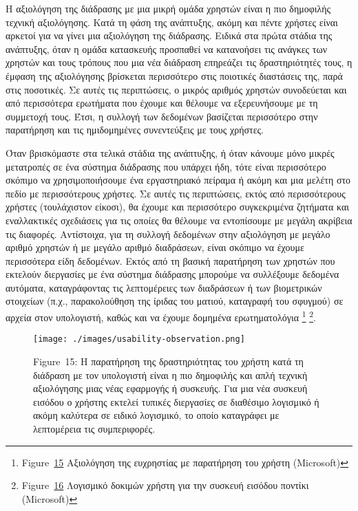 \documentclass[
]{article}
\begin{document}
Η αξιολόγηση της διάδρασης με μια μικρή ομάδα χρηστών είναι η πιο
δημοφιλής τεχνική αξιολόγησης. Κατά τη φάση της ανάπτυξης, ακόμη και
πέντε χρήστες είναι αρκετοί για να γίνει μια αξιολόγηση της διάδρασης.
Ειδικά στα πρώτα στάδια της ανάπτυξης, όταν η ομάδα κατασκευής προσπαθεί
να κατανοήσει τις ανάγκες των χρηστών και τους τρόπους που μια νέα
διάδραση επηρεάζει τις δραστηριότητές τους, η έμφαση της αξιολόγησης
βρίσκεται περισσότερο στις ποιοτικές διαστάσεις της, παρά στις
ποσοτικές. Σε αυτές τις περιπτώσεις, ο μικρός αριθμός χρηστών
συνοδεύεται και από περισσότερα ερωτήματα που έχουμε και θέλουμε να
εξερευνήσουμε με τη συμμετοχή τους. Έτσι, η συλλογή των δεδομένων
βασίζεται περισσότερο στην παρατήρηση και τις ημιδομημένες συνεντεύξεις
με τους χρήστες.

Όταν βρισκόμαστε στα τελικά στάδια της ανάπτυξης, ή όταν κάνουμε μόνο
μικρές μετατροπές σε ένα σύστημα διάδρασης που υπάρχει ήδη, τότε είναι
περισσότερο σκόπιμο να χρησιμοποιήσουμε ένα εργαστηριακό πείραμα ή ακόμη
και μια μελέτη στο πεδίο με περισσότερους χρήστες. Σε αυτές τις
περιπτώσεις, εκτός από περισσότερους χρήστες (τουλάχιστον είκοσι), θα
έχουμε και περισσότερο συγκεκριμένα ζητήματα και εναλλακτικές σχεδιάσεις
για τις οποίες θα θέλουμε να εντοπίσουμε με μεγάλη ακρίβεια τις
διαφορές. Αντίστοιχα, για τη συλλογή δεδομένων στην αξιολόγηση με μεγάλο
αριθμό χρηστών ή με μεγάλο αριθμό διαδράσεων, είναι σκόπιμο να έχουμε
περισσότερα είδη δεδομένων. Εκτός από τη βασική παρατήρηση των χρηστών
που εκτελούν διεργασίες με ένα σύστημα διάδρασης μπορούμε να συλλέξουμε
δεδομένα αυτόματα, καταγράφοντας τις λεπτομέρειες των διαδράσεων ή των
βιομετρικών στοιχείων (π.χ., παρακολούθηση της ίριδας του ματιού,
καταγραφή του σφυγμού) σε αρχεία στον υπολογιστή, καθώς και να έχουμε
δομημένα ερωτηματολόγια \footnote{Figure~\protect\hyperlink{fig:usability-observation}{15}
  Αξιολόγηση της ευχρηστίας με παρατήρηση του χρήστη (Microsoft)}
\footnote{Figure~\protect\hyperlink{fig:mouse-test-software}{16}
  Λογισμικό δοκιμών χρήστη για την συσκευή εισόδου ποντίκι (Microsoft)}.

\leavevmode{}%
\begin{figure}
\hypertarget{fig:usability-observation}{%
\centering
\texttt{[image: ./images/usability-observation.png]}
\caption{Figure~15: Η παρατήρηση της δραστηριότητας του χρήστη κατά τη
διάδραση με τον υπολογιστή είναι η πιο δημοφιλής και απλή τεχνική
αξιολόγησης μιας νέας εφαρμογής ή συσκευής. Για μια νέα συσκευή εισόδου
ο χρήστης εκτελεί τυπικές διεργασίες σε διαθέσιμο λογισμικό ή ακόμη
καλύτερα σε ειδικό λογισμικό, το οποίο καταγράφει με λεπτομέρεια τις
συμπεριφορές.}\label{fig:usability-observation}
}
\end{figure}
\end{document}
